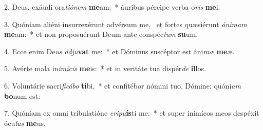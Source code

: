 2. Deus, exáudi ora\textit{ti}\textit{ó}\textit{nem} \textbf{me}am:~*  áuribus pércipe verba o\textit{ris} \textbf{me}i.\

3. Quóniam aliéni insurrexérunt advérsum me, \dag\  et fortes quæsiérunt \textit{á}\textit{ni}\textit{mam} \textbf{me}am:~*  et non proposuérunt Deum ante conspéc\textit{tum} \textbf{su}um.\

4. Ecce enim De\textit{us} \textit{ád}\textit{ju}\textbf{vat} me:~*  et Dóminus suscéptor est áni\textit{mæ} \textbf{me}æ.\

5. Avérte mala in\textit{i}\textit{mí}\textit{cis} \textbf{me}is:~*  et in veritáte tua dispér\textit{de} \textbf{il}los.\

6. Voluntárie sacri\textit{fi}\textit{cá}\textit{bo} \textbf{ti}bi,~*  et confitébor nómini tuo, Dómine: quóni\textit{am} \textbf{bo}num est:\

7. Quóniam ex omni tribulatióne \textit{e}\textit{ri}\textit{pu}\textbf{ís}ti me:~*  et super inimícos meos despéxit ócu\textit{lus} \textbf{me}us.\


